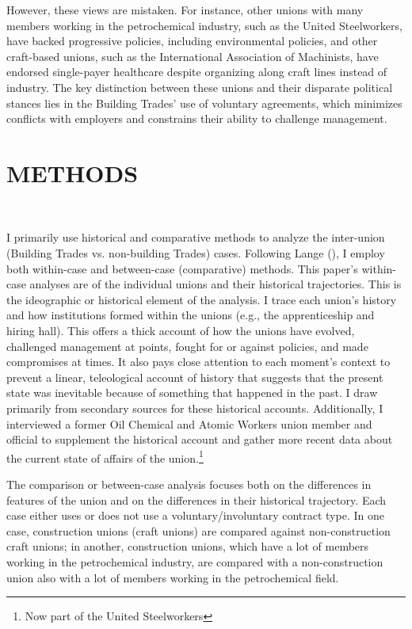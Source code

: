 \documentclass[12pt]{article}
\begin{document}
However, these views are mistaken. For instance, other unions with many members working in the petrochemical industry, such as the United Steelworkers, have backed progressive policies, including environmental policies, and other craft-based unions, such as the International Association of Machinists, have endorsed single-payer healthcare despite organizing along craft lines instead of industry. The key distinction between these unions and their disparate political stances lies in the Building Trades' use of voluntary agreements, which minimizes conflicts with employers and constrains their ability to challenge management.


\section{METHODS} \

I primarily use historical and comparative methods to analyze the inter-union (Building Trades vs. non-building Trades) cases. Following Lange (\citeyear{langeComparativeHistoricalMethods2013}), I employ both within-case and between-case (comparative) methods. This paper's within-case analyses are of the individual unions and their historical trajectories. This is the ideographic or historical element of the analysis. I trace each union's history and how institutions formed within the unions (e.g., the apprenticeship and hiring hall). This offers a thick account of how the unions have evolved, challenged management at points, fought for or against policies, and made compromises at times. It also pays close attention to each moment's context to prevent a linear, teleological account of history that suggests that the present state was inevitable because of something that happened in the past. I draw primarily from secondary sources for these historical accounts. Additionally, I interviewed a former Oil Chemical and Atomic Workers union member and official to supplement the historical account and gather more recent data about the current state of affairs of the union.\footnote{Now part of the United Steelworkers}

The comparison or between-case analysis focuses both on the differences in features of the union and on the differences in their historical trajectory. Each case either uses or does not use a voluntary/involuntary contract type. In one case, construction unions (craft unions) are compared against non-construction craft unions; in another, construction unions, which have a lot of members working in the petrochemical industry, are compared with a non-construction union also with a lot of members working in the petrochemical field. 
\end{document}
